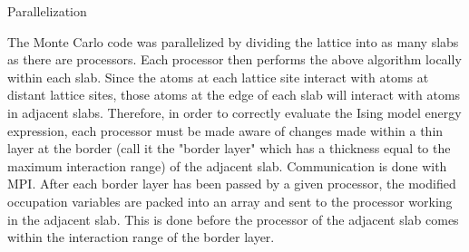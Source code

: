 Parallelization

The Monte Carlo code was parallelized by dividing the lattice into as
many slabs as there are processors. Each processor then performs the
above algorithm locally within each slab. Since the atoms at each
lattice site interact with atoms at distant lattice sites, those atoms
at the edge of each slab will interact with atoms in adjacent
slabs. Therefore, in order to correctly evaluate the Ising model
energy expression, each processor must be made aware of changes made
within a thin layer at the border (call it the "border layer" which
has a thickness equal to the maximum interaction range) of the
adjacent slab. Communication is done with MPI. After each border layer
has been passed by a given processor, the modified occupation
variables are packed into an array and sent to the processor working
in the adjacent slab. This is done before the processor of the
adjacent slab comes within the interaction range of the border layer.

